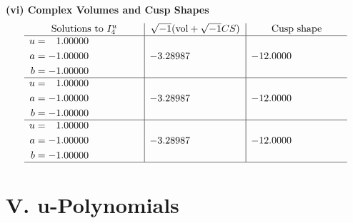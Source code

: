 \documentclass[1p]{elsarticle_modified}
\theoremstyle{definition}
\newcommand{\I}{\sqrt{-1}}
\begin{document}
\newpage\flushleft \textbf{(vi) Complex Volumes and Cusp Shapes}
$$\begin{array}{c|c|c}  
\text{Solutions to }I^u_{4}& \I (\text{vol} + \sqrt{-1}CS) & \text{Cusp shape}\\
 \hline 
\begin{aligned}
u &= \phantom{-}1.00000\phantom{ +0.000000I} \\
a &= -1.00000\phantom{ +0.000000I} \\
b &= -1.00000\phantom{ +0.000000I}\end{aligned}
 & -3.28987\phantom{ +0.000000I} & -12.0000\phantom{ +0.000000I} \\ \hline\begin{aligned}
u &= \phantom{-}1.00000\phantom{ +0.000000I} \\
a &= -1.00000\phantom{ +0.000000I} \\
b &= -1.00000\phantom{ +0.000000I}\end{aligned}
 & -3.28987\phantom{ +0.000000I} & -12.0000\phantom{ +0.000000I} \\ \hline\begin{aligned}
u &= \phantom{-}1.00000\phantom{ +0.000000I} \\
a &= -1.00000\phantom{ +0.000000I} \\
b &= -1.00000\phantom{ +0.000000I}\end{aligned}
 & -3.28987\phantom{ +0.000000I} & -12.0000\phantom{ +0.000000I}\\
 \hline 
 \end{array}$$\newpage
\newpage\renewcommand{\arraystretch}{1}
\centering \section*{ V. u-Polynomials}
\end{document}
